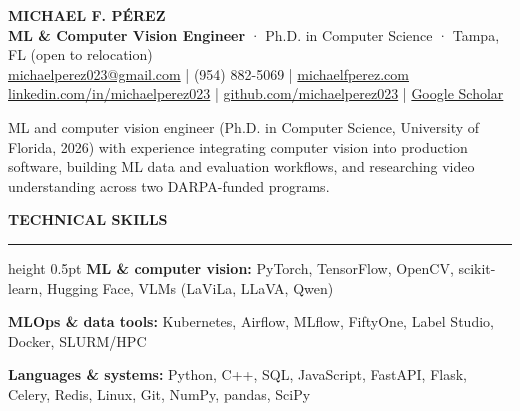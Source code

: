 \documentclass[10pt,letterpaper]{article}
\newcommand{\ressection}[1]{\par\addvspace{9pt}\textbf{\MakeUppercase{#1}}\par\nobreak\vspace{1.5pt}\hrule height 0.5pt\nobreak\vspace{4.5pt}}
\newcommand{\resskill}[2]{\textbf{#1:} #2\par\vspace{1pt}}
\begin{document}
\fontsize{10.5}{12.9}\selectfont
\begin{center}
{\fontsize{19}{22}\selectfont\textbf{MICHAEL F. PÉREZ}}\\[3pt]
\textbf{ML \& Computer Vision Engineer} · Ph.D. in Computer Science · Tampa, FL (open to relocation)\\[1.5pt]
\href{mailto:michaelperez023@gmail.com}{michaelperez023@gmail.com} | (954) 882-5069 | \href{https://www.michaelfperez.com}{michaelfperez.com}\\[1.5pt]
\href{https://www.linkedin.com/in/michaelperez023/}{linkedin.com/in/michaelperez023} | \href{https://github.com/michaelperez023}{github.com/michaelperez023} | \href{https://scholar.google.com/citations?user=fCzyXhUAAAAJ\&hl=en}{Google Scholar}
\end{center}
\vspace{-4pt}
ML and computer vision engineer (Ph.D. in Computer Science, University of Florida, 2026) with experience integrating computer vision into production software, building ML data and evaluation workflows, and researching video understanding across two DARPA-funded programs.

\ressection{Technical Skills}
\resskill{ML \& computer vision}{PyTorch, TensorFlow, OpenCV, scikit-learn, Hugging Face, VLMs (LaViLa, LLaVA, Qwen)}
\resskill{MLOps \& data tools}{Kubernetes, Airflow, MLflow, FiftyOne, Label Studio, Docker, SLURM/HPC}
\resskill{Languages \& systems}{Python, C++, SQL, JavaScript, FastAPI, Flask, Celery, Redis, Linux, Git, NumPy, pandas, SciPy}
\end{document}
